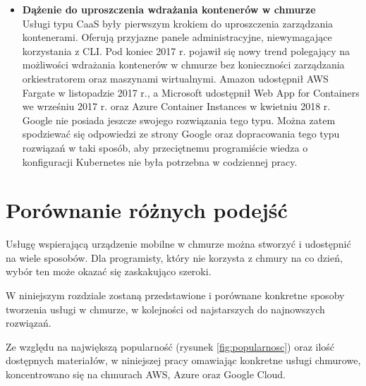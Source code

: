 \documentclass[12pt,a4paper,twoside,titlepage,openright]{book}
\begin{document}
\begin{itemize}
\item \textbf{Dążenie do uproszczenia wdrażania kontenerów w chmurze} \\
Usługi typu CaaS były pierwszym krokiem do uproszczenia zarządzania kontenerami. Oferują przyjazne panele administracyjne, niewymagające korzystania z CLI. Pod koniec 2017 r. pojawił się nowy trend polegający na możliwości wdrażania kontenerów w chmurze bez konieczności zarządzania orkiestratorem oraz maszynami wirtualnymi. Amazon udostępnił AWS Fargate w listopadzie 2017 r.,\cite{siteAwsFargateIntroducing} a Microsoft udostępnił Web App for Containers we wrześniu 2017 r.\cite{siteAzureWebAppContainersAvailable} oraz Azure Container Instances w kwietniu 2018 r.\cite{siteAzureContainerInstancesIntroducing} Google nie posiada jeszcze swojego rozwiązania tego typu. Można zatem spodziewać się odpowiedzi ze strony Google oraz dopracowania tego typu rozwiązań w taki sposób, aby przeciętnemu programiście wiedza o konfiguracji Kubernetes nie była potrzebna w codziennej pracy.

\end{itemize}






\chapter{Porównanie różnych podejść}

Usługę wspierającą urządzenie mobilne w chmurze można stworzyć i udostępnić na wiele sposobów. Dla programisty, który nie korzysta z chmury na co dzień, wybór ten może okazać się zaskakująco szeroki.

W niniejszym rozdziale zostaną przedstawione i porównane konkretne sposoby tworzenia usługi w chmurze, w kolejności od najstarszych do najnowszych rozwiązań.

Ze względu na największą popularność (rysunek \ref{fig:popularnosc}) oraz ilość dostępnych materiałów, w niniejszej pracy omawiając konkretne usługi chmurowe, koncentrowano się na chmurach AWS, Azure oraz Google Cloud.
\end{document}
